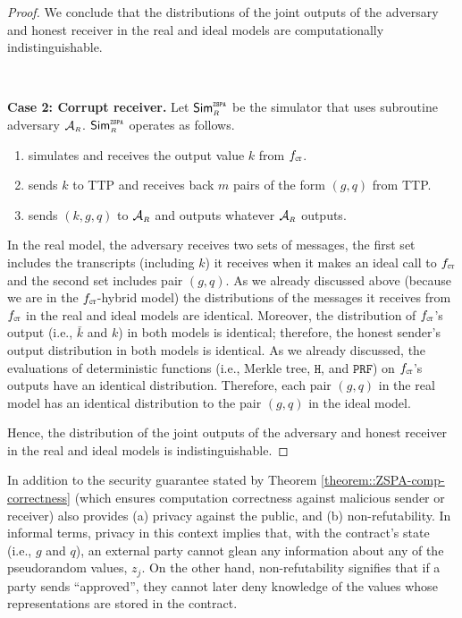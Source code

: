\begin{proof}
 We conclude that the distributions of the joint outputs of the adversary and honest receiver in the real and ideal models are computationally indistinguishable. 


\

\noindent\textbf{Case 2: Corrupt receiver.}   Let $\mathsf{Sim}^{\scriptscriptstyle \mathtt{ZSPA}}_{\scriptscriptstyle R}$ be the simulator that uses subroutine adversary $\mathcal{A}_{\scriptscriptstyle R}$. $\mathsf{Sim}^{\scriptscriptstyle \mathtt{ZSPA}}_{\scriptscriptstyle R}$ operates as follows. 

\begin{enumerate}
%
\item simulates   \ct  and receives the output value $ k$ from $f_{\scriptscriptstyle \mathtt{CT}}$.
%
\item sends $ k$ to TTP and receives back $m$ pairs of the form $( g,  q)$ from TTP. 
%
\item sends $( k,  g,  q)$ to $\mathcal{A}_{\scriptscriptstyle R}$ and outputs whatever  $\mathcal{A}_{\scriptscriptstyle R}$ outputs. 
%
 \end{enumerate}
 
 
In the real model, the adversary receives two sets of messages, the first set includes the transcripts (including $ k$) it receives when it makes an ideal call to $f_{\scriptscriptstyle \mathtt{CT}}$ and the second set includes pair $(g, q)$. As we already discussed above (because we are in the  $f_{\scriptscriptstyle \mathtt{CT}}$-hybrid model) the distributions of the messages it receives from $f_{\scriptscriptstyle \mathtt{CT}}$ in the real and ideal models are identical. Moreover, the distribution of $f_{\scriptscriptstyle \mathtt{CT}}$'s output (i.e., $\bar k$ and $k$) in both models is identical; therefore, the honest sender's output distribution in both models is identical. As we already discussed,  the evaluations of deterministic functions (i.e., Merkle tree, $\mathtt{H}$, and $\mathtt{PRF}$) on $f_{\scriptscriptstyle \mathtt{CT}}$'s outputs have an identical distribution. Therefore, each pair $(g, q)$ in the real model has an identical distribution to the pair $(g, q)$ in the ideal model.  

Hence, the distribution of the joint outputs of the adversary and honest receiver in the real and ideal models is indistinguishable.
%
\end{proof}

In addition to the security guarantee stated by Theorem \ref{theorem::ZSPA-comp-correctness} (which ensures computation correctness against malicious sender or receiver)  \zspa also provides  (a) privacy against the public, and (b)  non-refutability. In informal terms, privacy in this context implies that, with the contract's state (i.e., $g$ and  $q$), an external party cannot glean any information about any of the pseudorandom values,  $z_{\scriptscriptstyle j}$.  On the other hand, non-refutability signifies that if a party sends ``approved'', they cannot later deny knowledge of the values whose representations are stored in the contract. %


